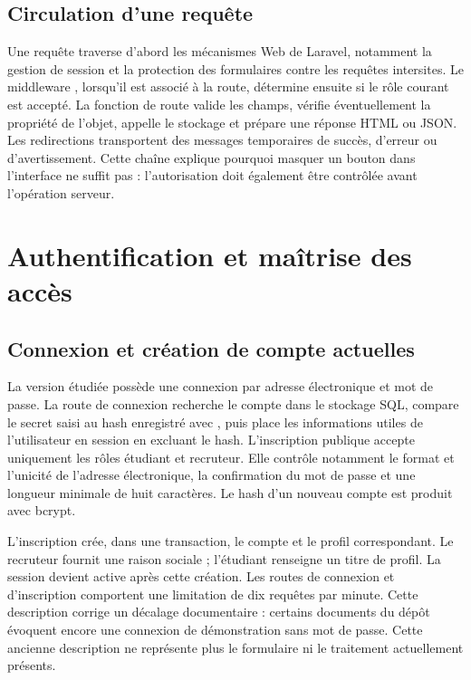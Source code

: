 \subsection{Circulation d'une requête}

Une requête traverse d'abord les mécanismes Web de Laravel, notamment la gestion de session et la protection des formulaires contre les requêtes intersites. Le middleware , lorsqu'il est associé à la route, détermine ensuite si le rôle courant est accepté. La fonction de route valide les champs, vérifie éventuellement la propriété de l'objet, appelle le stockage et prépare une réponse HTML ou JSON. Les redirections transportent des messages temporaires de succès, d'erreur ou d'avertissement. Cette chaîne explique pourquoi masquer un bouton dans l'interface ne suffit pas : l'autorisation doit également être contrôlée avant l'opération serveur.

\section{Authentification et maîtrise des accès}

\subsection{Connexion et création de compte actuelles}

La version étudiée possède une connexion par adresse électronique et mot de passe. La route de connexion recherche le compte dans le stockage SQL, compare le secret saisi au hash enregistré avec , puis place les informations utiles de l'utilisateur en session en excluant le hash. L'inscription publique accepte uniquement les rôles étudiant et recruteur. Elle contrôle notamment le format et l'unicité de l'adresse électronique, la confirmation du mot de passe et une longueur minimale de huit caractères. Le hash d'un nouveau compte est produit avec bcrypt.

L'inscription crée, dans une transaction, le compte et le profil correspondant. Le recruteur fournit une raison sociale ; l'étudiant renseigne un titre de profil. La session devient active après cette création. Les routes de connexion et d'inscription comportent une limitation de dix requêtes par minute. Cette description corrige un décalage documentaire : certains documents du dépôt évoquent encore une connexion de démonstration sans mot de passe. Cette ancienne description ne représente plus le formulaire ni le traitement actuellement présents.


